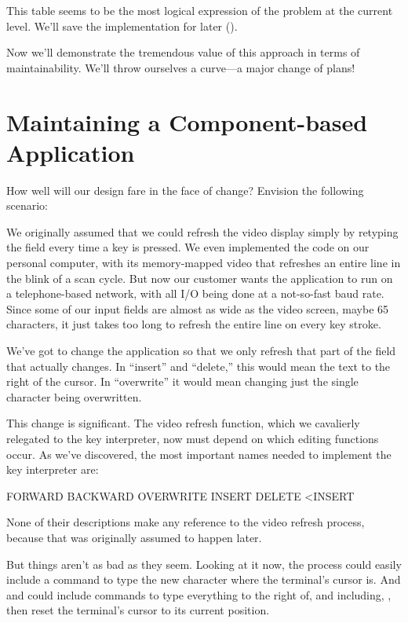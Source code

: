 This table seems to be the most logical expression of the problem at
the current level. We'll save the implementation for later ().

Now we'll demonstrate the tremendous value of this approach in
terms of maintainability. We'll throw ourselves a curve---a major change
of plans!

\section{Maintaining a Component-based Application}

How well will our design fare in the face of change? Envision the following
scenario:

We originally assumed that we could refresh the video display simply
by retyping the field every time a key is pressed. We even implemented
the code on our personal computer, with its memory-mapped video that
refreshes an entire line in the blink of a scan cycle. But now our
customer wants the application to run on a telephone-based network,
with all I/O being done at a not-so-fast baud rate. Since some of our
input fields are almost as wide as the video screen, maybe 65
characters, it just takes too long to refresh the entire line on every
key stroke.

We've got to change the application so that we only refresh that
part of the field that actually changes. In ``insert'' and ``delete,'' this
would mean the text to the right of the cursor. In ``overwrite'' it would
mean changing just the single character being overwritten.

This change is significant. The video refresh function, which we
cavalierly relegated to the key interpreter, now must depend on which
editing functions occur. As we've discovered, the most important names
needed to implement the key interpreter are:

\begin{Code}[fontfamily=cmss]
FORWARD
BACKWARD
OVERWRITE
INSERT
DELETE
<INSERT
\end{Code}
None of their descriptions make any reference to the video refresh
process, because that was originally assumed to happen later.

But things aren't as bad as they seem. Looking at it now, the process
 could easily include a command to type the new
character where the terminal's cursor is. And  and
 could include commands to type everything to the right
of, and including, , then reset the terminal's cursor
to its current position.

